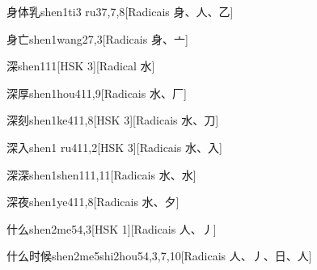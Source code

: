 \begin{entry}{身体乳}{shen1ti3 ru3}{7,7,8}[Radicais ⾝、⼈、⼄]
\end{entry}

\begin{entry}{身亡}{shen1wang2}{7,3}[Radicais ⾝、⼇]
\end{entry}

\begin{entry}{深}{shen1}{11}[HSK 3][Radical ⽔]
\end{entry}

\begin{entry}{深厚}{shen1hou4}{11,9}[Radicais ⽔、⼚]
\end{entry}

\begin{entry}{深刻}{shen1ke4}{11,8}[HSK 3][Radicais ⽔、⼑]
\end{entry}

\begin{entry}{深入}{shen1 ru4}{11,2}[HSK 3][Radicais ⽔、⼊]
\end{entry}

\begin{entry}{深深}{shen1shen1}{11,11}[Radicais ⽔、⽔]
\end{entry}

\begin{entry}{深夜}{shen1ye4}{11,8}[Radicais ⽔、⼣]
\end{entry}

\begin{entry}{什么}{shen2me5}{4,3}[HSK 1][Radicais ⼈、⼃]
\end{entry}

\begin{entry}{什么时候}{shen2me5shi2hou5}{4,3,7,10}[Radicais ⼈、⼃、⽇、⼈]
\end{entry}

